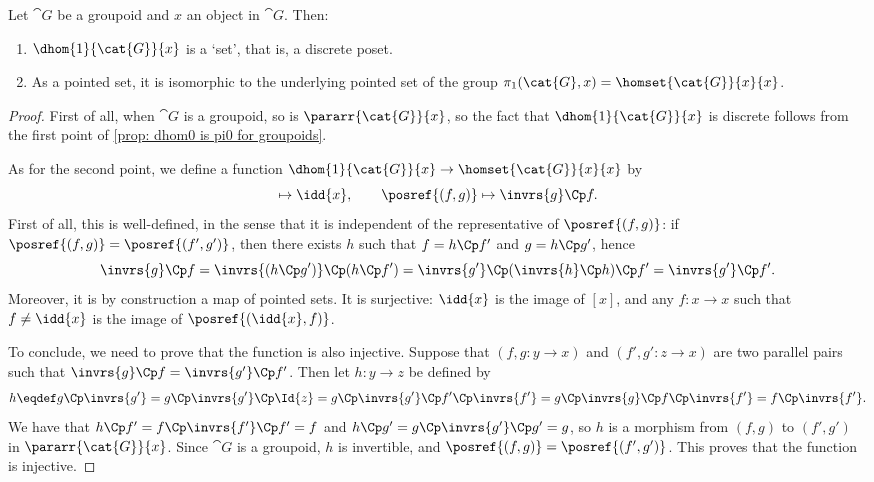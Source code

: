     \begingroup
    \def\theproposition{\ref{prop: dhom1 is pi1 for groupoids}}
    \begin{proposition}
        Let $\cat{G}$ be a groupoid and $x$ an object in $\cat{G}$.
        Then:
        \begin{enumerate}
            \item $\dhom{1}{\cat{G}}{x}$ is a `set', that is, a discrete poset.
            \item As a pointed set, it is isomorphic to the underlying pointed set of the group $\pi_1(\cat{G}, x) = \homset{\cat{G}}{x}{x}$.
        \end{enumerate}
    \end{proposition}
    \addtocounter{proposition}{-1}
    \endgroup
    \begin{proof}
        First of all, when $\cat{G}$ is a groupoid, so is $\pararr{\cat{G}}{x}$, so the fact that $\dhom{1}{\cat{G}}{x}$ is discrete follows from the first point of \autoref{prop: dhom0 is pi0 for groupoids}.

        As for the second point, we define a function $\dhom{1}{\cat{G}}{x} \to \homset{\cat{G}}{x}{x}$ by
        \begin{equation*}
            [x] \mapsto \idd{x}, \quad \quad \posref{(f, g)} \mapsto \invrs{g}\Cp f.
        \end{equation*}
        First of all, this is well-defined, in the sense that it is independent of the representative of $\posref{(f, g)}$: if $\posref{(f, g)} = \posref{(f', g')}$, then there exists $h$ such that $f = h\Cp f'$ and $g = h\Cp g'$, hence
        \begin{equation*}
            \invrs{g}\Cp f = \invrs{(h\Cp g')}\Cp (h\Cp f') = \invrs{g'}\Cp (\invrs{h}\Cp h)\Cp f' = \invrs{g'}\Cp f'.
        \end{equation*}
        Moreover, it is by construction a map of pointed sets.
        It is surjective: $\idd{x}$ is the image of $[x]$, and any $f\colon x \to x$ such that $f \neq \idd{x}$ is the image of $\posref{(\idd{x}, f)}$.
        
        To conclude, we need to prove that the function is also injective. Suppose that $(f, g\colon y \to x)$ and $(f', g'\colon z \to x)$ are two parallel pairs such that $\invrs{g}\Cp f = \invrs{g'}\Cp f'$.
        Then let $h\colon y \to z$ be defined by
        \begin{equation*}
            h \eqdef g\Cp \invrs{g'} = g \Cp \invrs{g'} \Cp \Id{z} =   g\Cp \invrs{g'}\Cp f'\Cp \invrs{f'} = g\Cp \invrs{g}\Cp f\Cp \invrs{f'} = f\Cp \invrs{f'}.
        \end{equation*}
        We have that $h\Cp  f' = f\Cp \invrs{f'}\Cp f' = f$ and $h\Cp  g' = g\Cp \invrs{g'}\Cp g' = g$, so $h$ is a morphism from $(f, g)$ to $(f', g')$ in $\pararr{\cat{G}}{x}$. Since $\cat{G}$ is a groupoid, $h$ is invertible, and $\posref{(f, g)} = \posref{(f', g')}$.
        This proves that the function is injective.
    \end{proof}
